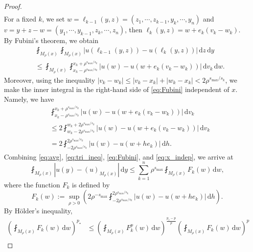 \documentclass[11pt]{amsart}
\theoremstyle{plain}
\theoremstyle{definition}
\numberwithin{equation}{section}
\begin{document}
\begin{proof}
\begin{equation}
\begin{split}
\end{split}
\end{equation}
For a fixed $k$, we set $w=\ell_{k-1}(y,z) = (z_1,\cdots, z_{k-1}, y_k, \cdots, y_n)$ and $v = y+z-w = (y_1,\cdots, y_{k-1}, z_k, \cdots, z_n)$, then $\ell_k(y,z) = w+e_k(v_k-w_k)$. By Fubini's theorem, we obtain
\begin{equation} \label{eq:Fubini}
\begin{split}
&\fint_{M_\rho(x)} \fint_{M_\rho(x)} |u(\ell_{k-1}(y,z)) - u(\ell_k(y,z))| \,\mathrm{d}z\,\mathrm{d}y \\
&\leq \fint_{M_{\rho}(x)} \fint_{x_k-\rho^{s_{\max}/s_k}}^{x_k+\rho^{s_{\max}/s_k}} |u(w) - u(w+e_k(v_k-w_k))| \,\mathrm{d}v_k\,\mathrm{d}w.
\end{split}
\end{equation}
Moreover, using the inequality $|v_k-w_k| \leq |v_k-x_k| + |w_k-x_k| < 2\rho^{s_{\max}/s_k}$, we make the inner integral in the right-hand side of \eqref{eq:Fubini} independent of $x$. Namely, we have
\begin{equation} \label{eq:x_indep}
\begin{split}
&\fint_{x_k-\rho^{s_{\max}/s_k}}^{x_k+\rho^{s_{\max}/s_k}} |u(w) - u(w+e_k(v_k-w_k))| \,\mathrm{d}v_k \\
&\leq 2 \fint_{w_k-2\rho^{s_{\max}/s_k}}^{w_k+2\rho^{s_{\max}/s_k}} |u(w) - u(w+e_k(v_k-w_k))| \,\mathrm{d}v_k \\
&= 2 \fint_{-2\rho^{s_{\max}/s_k}}^{2\rho^{s_{\max}/s_k}} |u(w) - u(w+he_k)| \,\mathrm{d}h.
\end{split}
\end{equation}
Combining \eqref{eq:avg}, \eqref{eq:tri_ineq}, \eqref{eq:Fubini}, and \eqref{eq:x_indep}, we arrive at
\begin{equation} \label{eq:F_k}
\fint_{M_\rho(x)} |u(y) - (u)_{M_\rho(x)}| \,\mathrm{d}y \leq \sum_{k=1}^n \rho^{s_{\max}} \fint_{M_{\rho}(x)} F_k(w) \,\mathrm{d}w,
\end{equation}
where the function $F_k$ is defined by
\begin{equation*}
F_k(w) := \sup_{\rho > 0} \left( 2\rho^{-s_{\max}} \fint_{-2\rho^{s_{\max}/s_k}}^{2\rho^{s_{\max}/s_k}} |u(w) - u(w+he_k)| \,\mathrm{d}h \right).
\end{equation*}
By H\"older's inequality,
\begin{equation} \label{eq:F_k_Holder}
\begin{split}
\left( \fint_{M_\rho(x)} F_k(w) \,\mathrm{d}w \right)^{p_{\star}} 
&\leq \left( \fint_{M_{\rho}(x)} F_k^p(w) \,\mathrm{d}w \right)^{\frac{{p_{\star}}-p}{p}} \left( \fint_{M_{\rho}(x)} F_k(w) \,\mathrm{d}w \right)^p \\

\end{split}
\end{equation}
\end{proof}
\end{document}
